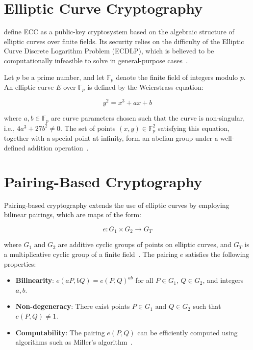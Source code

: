 \documentclass[cic,tc,english]{iiufrgs}
\numberwithin{algorithm}{chapter}
\begin{document}
    \section{Elliptic Curve Cryptography}
        \label{sec:ecc}

        \citet{hankerson2004guide} define ECC as a public-key cryptosystem based on the algebraic structure of elliptic curves over finite fields. Its security relies on the difficulty of the Elliptic Curve Discrete Logarithm Problem (ECDLP), which is believed to be computationally infeasible to solve in general-purpose cases~\citep{hankerson2004guide, koblitz1987elliptic}.

        Let $p$ be a prime number, and let $\mathbb{F}_p$ denote the finite field of integers modulo $p$. An elliptic curve $E$ over $\mathbb{F}_p$ is defined by the Weierstrass equation:

        \begin{equation}
        \label{eq:elliptic_curve}
        y^2 = x^3 + ax + b
        \end{equation}

        where $a, b \in \mathbb{F}_p$ are curve parameters chosen such that the curve is non-singular, i.e., $4a^3 + 27b^2 \neq 0$. The set of points $(x, y) \in \mathbb{F}_p^2$ satisfying this equation, together with a special point at infinity, form an abelian group under a well-defined addition operation~\citep{hankerson2004guide}.

    \section{Pairing-Based Cryptography}
        \label{sec:pairing}

        Pairing-based cryptography extends the use of elliptic curves by employing bilinear pairings, which are maps of the form:

        \begin{equation}
        e: G_1 \times G_2 \rightarrow G_T
        \end{equation}

        where $G_1$ and $G_2$ are additive cyclic groups of points on elliptic curves, and $G_T$ is a multiplicative cyclic group of a finite field~\citep{boneh2001identity}. The pairing $e$ satisfies the following properties:

        \begin{itemize}
            \item \textbf{Bilinearity}: $e(aP, bQ) = e(P, Q)^{ab}$ for all $P \in G_1$, $Q \in G_2$, and integers $a, b$.
            \item \textbf{Non-degeneracy}: There exist points $P \in G_1$ and $Q \in G_2$ such that $e(P, Q) \neq 1$.
            \item \textbf{Computability}: The pairing $e(P, Q)$ can be efficiently computed using algorithms such as Miller's algorithm~\citep{miller1986use}.
        \end{itemize}
\end{document}
